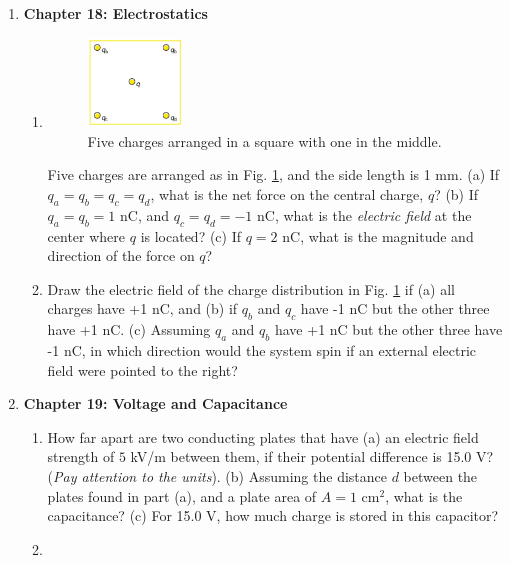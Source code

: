 \documentclass[10pt]{article}
\begin{document}
\begin{enumerate}
\item \textbf{Chapter 18: Electrostatics}
\begin{enumerate}
\item 
\begin{figure}
\centering
\includegraphics[width=0.25\textwidth]{charges.png}
\caption{\label{fig:charges} Five charges arranged in a square with one in the middle.}
\end{figure}
Five charges are arranged as in Fig. \ref{fig:charges}, and the side length is 1 mm. (a) If $q_a = q_b = q_c = q_d$, what is the net force on the central charge, $q$? (b) If $q_a = q_b = 1$ nC, and $q_c = q_d = -1$ nC, what is the \textit{electric field} at the center where $q$ is located?  (c) If $q=2$ nC, what is the magnitude and direction of the force on $q$? \\ \vspace{4cm}
\item Draw the electric field of the charge distribution in Fig. \ref{fig:charges} if (a) all charges have +1 nC, and (b) if $q_b$ and $q_c$ have -1 nC but the other three have +1 nC.  (c) Assuming $q_a$ and $q_b$ have +1 nC but the other three have -1 nC, in which direction would the system spin if an external electric field were pointed to the right? \\ \vspace{5cm}
\end{enumerate}
\item \textbf{Chapter 19: Voltage and Capacitance}
\begin{enumerate}
\item  How far apart are two conducting plates that have (a) an electric field strength of $5$ kV/m between them, if their potential difference is 15.0 V? (\textit{Pay attention to the units}). (b) Assuming the distance $d$ between the plates found in part (a), and a plate area of $A = 1$ cm$^2$, what is the capacitance? (c) For 15.0 V, how much charge is stored in this capacitor? \\ \vspace{4cm}
\item
\begin{figure}

\end{figure}
\end{enumerate}
\end{enumerate}
\end{document}

